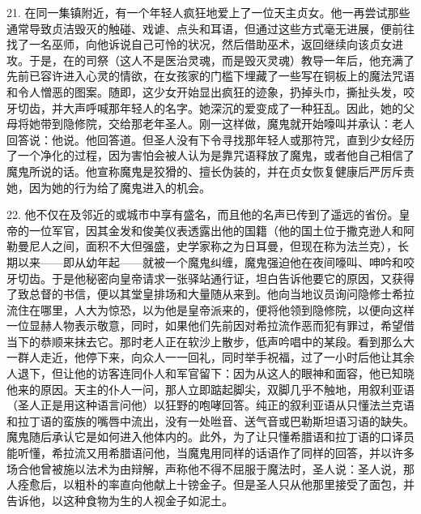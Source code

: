 21. 在同一集镇附近，有一个年轻人疯狂地爱上了一位天主贞女。他一再尝试那些通常导致贞洁毁灭的触碰、戏谑、点头和耳语，但通过这些方式毫无进展，便前往找了一名巫师，向他诉说自己可怜的状况，然后借助巫术，返回继续向该贞女进攻。于是，在的司祭（这人不是医治灵魂，而是毁灭灵魂）教导一年后，他充满了先前已容许进入心灵的情欲，在女孩家的门槛下埋藏了一些写在铜板上的魔法咒语和令人憎恶的图案。随即，这少女开始显出疯狂的迹象，扔掉头巾，撕扯头发，咬牙切齿，并大声呼喊那年轻人的名字。她深沉的爱变成了一种狂乱。因此，她的父母将她带到隐修院，交给那老年圣人。刚一这样做，魔鬼就开始嚎叫并承认：老人回答说：他说。他回答道。但圣人没有下令寻找那年轻人或那符咒，直到少女经历了一个净化的过程，因为害怕会被人认为是靠咒语释放了魔鬼，或者他自己相信了魔鬼所说的话。他宣称魔鬼是狡猾的、擅长伪装的，并在贞女恢复健康后严厉斥责她，因为她的行为给了魔鬼进入的机会。\par

22. 他不仅在及邻近的或城市中享有盛名，而且他的名声已传到了遥远的省份。皇帝的一位军官，因其金发和俊美仪表透露出他的国籍（他的国土位于撒克逊人和阿勒曼尼人之间，面积不大但强盛，史学家称之为日耳曼，但现在称为法兰克），长期以来——即从幼年起——就被一个魔鬼纠缠，魔鬼强迫他在夜间嚎叫、呻吟和咬牙切齿。于是他秘密向皇帝请求一张驿站通行证，坦白告诉他要它的原因，又获得了致总督的书信，便以其堂皇排场和大量随从来到。他向当地议员询问隐修士希拉流住在哪里，人大为惊恐，以为他是皇帝派来的，便将他领到隐修院，以便向这样一位显赫人物表示敬意，同时，如果他们先前因对希拉流作恶而犯有罪过，希望借当下的恭顺来抹去它。那时老人正在软沙上散步，低声吟唱中的某段。看到那么大一群人走近，他停下来，向众人一一回礼，同时举手祝福，过了一小时后他让其余人退下，但让他的访客连同仆人和军官留下：因为从这人的眼神和面容，他已知晓他来的原因。天主的仆人一问，那人立即踮起脚尖，双脚几乎不触地，用叙利亚语（圣人正是用这种语言问他）以狂野的咆哮回答。纯正的叙利亚语从只懂法兰克语和拉丁语的蛮族的嘴唇中流出，没有一处咝音、送气音或巴勒斯坦语习语的缺失。魔鬼随后承认它是如何进入他体内的。此外，为了让只懂希腊语和拉丁语的口译员能听懂，希拉流又用希腊语问他，当魔鬼用同样的话语作了同样的回答，并以许多场合他曾被施以法术为由辩解，声称他不得不屈服于魔法时，圣人说：圣人说，那人痊愈后，以粗朴的率直向他献上十镑金子。但是圣人只从他那里接受了面包，并告诉他，以这种食物为生的人视金子如泥土。\par

